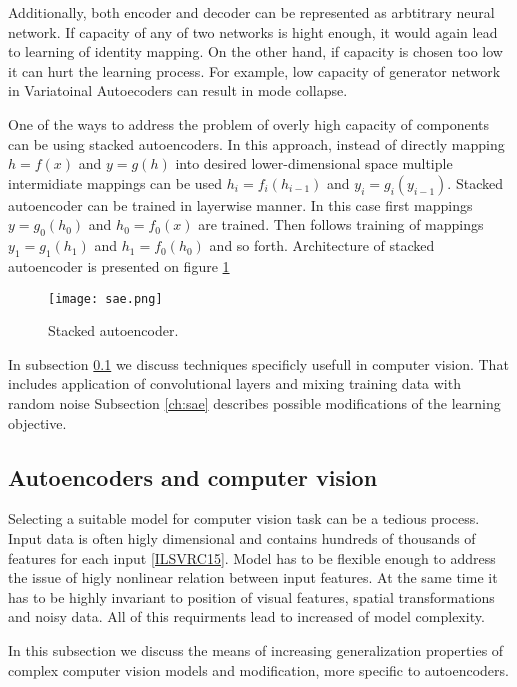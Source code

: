 Additionally, both encoder and decoder can be represented as arbtitrary neural network.
If capacity of any of two networks is hight enough, it would again lead to learning of identity mapping.
On the other hand, if capacity is chosen too low it can hurt the learning process.
For example, low capacity of generator network in Variatoinal Autoecoders can result in mode collapse.

One of the ways to address the problem of overly high capacity of components can be using stacked autoencoders.
In this approach, instead of directly mapping $h=f(x)$ and $y=g(h)$ into desired lower-dimensional space multiple intermidiate mappings can be used $h_i=f_i(h_{i-1})$ and $y_i=g_i(y_{i-1})$.
Stacked autoencoder can be trained in layerwise manner.
In this case first mappings $y=g_0(h_0)$ and $h_0=f_0(x)$ are trained.
Then follows training of mappings $y_1=g_1(h_1)$ and $h_1=f_0(h_0)$ and so forth.
Architecture of stacked autoencoder is presented on figure \ref{fig:sae}

\begin{figure}[h!]
  \centering
    \texttt{[image: sae.png]}
  \caption{Stacked autoencoder.}
  \label{fig:sae}
\end{figure}

In subsection \ref{ch:dcae} we discuss techniques specificly usefull in computer vision.
That includes application of convolutional layers and mixing training data with random noise
Subsection \ref{ch:sae} describes possible modifications of the learning objective.


\subsection{Autoencoders and computer vision}\label{ch:dcae}

Selecting a suitable model for computer vision task can be a tedious process.
Input data is often higly dimensional and contains hundreds of thousands of features for each input \ref{ILSVRC15}.
Model has to be flexible enough to address the issue of higly nonlinear relation between input features.
At the same time it has to be highly invariant to position of visual features, spatial transformations and noisy data.
All of this requirments lead to increased of model complexity.

In this subsection we discuss the means of increasing generalization properties of complex computer vision models and modification, more specific to autoencoders.

